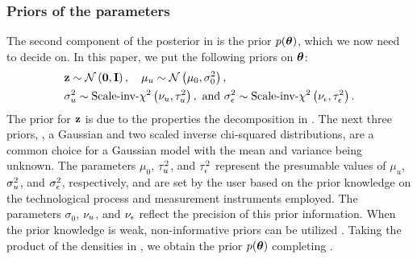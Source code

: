 \subsubsection{Priors of the parameters}
The second component of the posterior in  is the prior $\f{\vparam}$, which we now need to decide on. In this paper, we put the following priors on ${\boldsymbol\theta}$:
\begin{align}
  & \vz \sim \gaussian{\vZero}{\mOne}, \hspace{1em} \mu_\u \sim \gaussian{\mu_0}{\sigma^2_0}, \elabel{priors} \\
  & \sigma^2_\u \sim \sichisquared{\nu_\u}{\tau^2_\u}, \text{ and } \sigma^2_\noise \sim \sichisquared{\nu_\noise}{\tau^2_\noise}. \nonumber
\end{align}
The prior for $\mathbf{z}$ is due to the properties the decomposition in .
The next three priors, \ie, a Gaussian and two scaled inverse chi-squared distributions, are a common choice for a Gaussian model with the mean and variance being unknown.
The parameters $\mu_0$, $\tau^2_u$, and $\tau^2_\epsilon$ represent the presumable values of $\mu_u$, $\sigma^2_u$, and $\sigma^2_\epsilon$, respectively, and are set by the user based on the prior knowledge on the technological process and measurement instruments employed. The parameters $\sigma_0$, $\nu_u$, and $\nu_\epsilon$ reflect the precision of this prior information.
When the prior knowledge is weak, non-informative priors can be utilized \cite{gelman2004}.
Taking the product of the densities in , we obtain the prior $\f{\vparam}$ completing .

